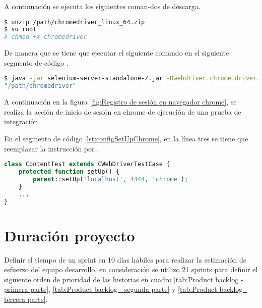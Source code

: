\begin{itemize}
\begin{enumerate}
A continuación se ejecuta los siguientes coman-dos de descarga.

\begin{lstlisting}[language=bash, caption={Instalación de programa de control para chrome.}]
$ unzip /path/chromedriver_linux_64.zip
$ su root
# chmod +x chromedriver
\end{lstlisting}

De manera que se tiene que ejecutar el siguiente comando en el siguiente
segmento de código .

\begin{lstlisting}[language=bash, caption={Configuración chromedriver en selenium server.}]
$ java -jar selenium-server-standalone-Z.jar -Dwebdriver.chrome.driver=
"/path/chromedriver"
\end{lstlisting}

A continuación en la figura \ref{fig:Registro de sesión en navegador chrome},
se realiza la acción de inicio de sesión en chrome de ejecución de una prueba
de integración.

\begin{minipage}{1.0\textwidth}
	\centering
	\label{fig:Registro de sesión en navegador chrome}
\end{minipage}

En el segmento de código \ref{lst:configSetUpChrome}, en la línea tres se
tiene que reemplazar la instrucción  por .

\begin{lstlisting}[language=PHP, caption={Configuración de ejecución de prueba para chrome.}, label={lst:configSetUpChrome}]
class ContentTest extends CWebDriverTestCase {
	protected function setUp() {
        parent::setUp('localhost', 4444, 'chrome');
    }
    ...
}
\end{lstlisting}

\end{enumerate}

\end{itemize}

\section{Duración proyecto}

Definir el tiempo de un sprint en 10 días hábiles para realizar la estimación
de esfuerzo del equipo desarrollo, en consideración se utilizo 21 sprints
para definir el siguiente orden de prioridad de las historias en cuadro
\ref{tab:Product backlog - primera parte}, 
\ref{tab:Product backlog - segunda parte} y
\ref{tab:Product backlog - tercera parte}.

